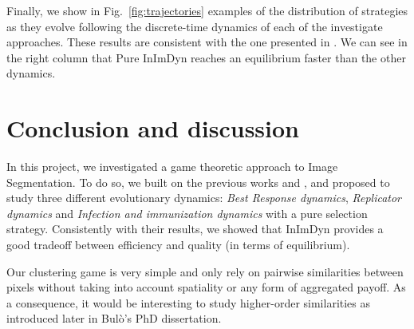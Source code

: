 \documentclass[11pt,a4paper]{article}
\begin{document}
Finally, we show in Fig.~\ref{fig:trajectories} examples of the distribution of strategies as they evolve following the discrete-time dynamics of each of the investigate approaches. These results are consistent with the one presented in \cite{game-clustering}. We can see in the right column that Pure InImDyn reaches an equilibrium faster than the other dynamics.


\section{Conclusion and discussion}

In this project, we investigated a game theoretic approach to Image Segmentation. To do so, we built on the previous works \cite{bulo-thesis} and \cite{game-clustering}, and proposed to study three different evolutionary dynamics: \textit{Best Response dynamics}, \textit{Replicator dynamics} and \textit{Infection and immunization dynamics} with a pure selection strategy. Consistently with their results, we showed that InImDyn provides a good tradeoff between efficiency and quality (in terms of equilibrium).

Our clustering game is very simple and only rely on pairwise similarities between pixels without taking into account spatiality or any form of aggregated payoff. As a consequence, it would be interesting to study higher-order similarities as introduced later in Bulò's PhD dissertation\cite{bulo-thesis}.



\end{document}
